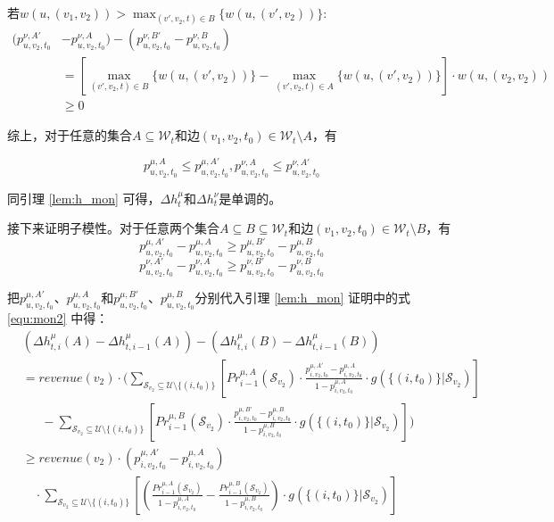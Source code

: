 若$w(u,(v_1,v_2)) > \max_{(v',v_2,t)\in B}\{w(u,(v',v_2))\}$:
\begin{align}
    (p_{u,v_2,t_0}^{\nu,A'}&-p_{u,v_2,t_0}^{\nu,A})-(p_{u,v_2,t_0}^{\nu,B'}-p_{u,v_2,t_0}^{\nu,B}) \\ 
    &=[\max_{(v',v_2,t)\in B}\{w(u,(v',v_2))\} - \max_{(v',v_2,t)\in A}\{w(u,(v',v_2))\}] \cdot w(u,(v_2,v_2)) \\
    &\ge 0
\end{align}

综上，对于任意的集合$A \subseteq \mathcal{W}_t$和边$(v_1,v_2,t_0) \in \mathcal{W}_t\setminus A$，有

\begin{equation}
    p_{u,v_2,t_0}^{\mu,A} \le p_{u,v_2,t_0}^{\mu,A'},p_{u,v_2,t_0}^{\nu,A} \le p_{u,v_2,t_0}^{\nu,A'}
\end{equation}

同引理 \ref{lem:h_mon} 可得，$\Delta h_t^\mu$和$\Delta h_t^\nu$是单调的。

接下来证明子模性。对于任意两个集合$A\subseteq B \subseteq \mathcal{W}_t$和边$(v_1,v_2,t_0) \in \mathcal{W}_t \setminus B$，有
\begin{equation}
    p_{u,v_2,t_0}^{\mu,A'}-p_{u,v_2,t_0}^{\mu,A}\ge  p_{u,v_2,t_0}^{\mu,B'}-p_{u,v_2,t_0}^{\mu,B}
\end{equation}
\begin{equation}
    p_{u,v_2,t_0}^{\nu,A'}-p_{u,v_2,t_0}^{\nu,A}\ge  p_{u,v_2,t_0}^{\nu,B'}-p_{u,v_2,t_0}^{\nu,B}
\end{equation}

把$p_{u,v_2,t_0}^{\mu,A'}$、$p_{u,v_2,t_0}^{\mu,A}$和$p_{u,v_2,t_0}^{\mu,B'}$、$p_{u,v_2,t_0}^{\mu,B}$分别代入引理 \ref{lem:h_mon} 证明中的式 \ref{equ:mon2} 中得：
\begin{align}
    &(\Delta h_{t,i}^{\mu}(A)-\Delta h_{t,i-1}^{\mu}(A)) - (\Delta h_{t,i}^{\mu}(B)-\Delta h_{t,i-1}^{\mu}(B)) \\ 
    &=revenue(v_2)\cdot (\sum_{\mathcal{S}_{v_2}\subseteq \mathcal{U}\setminus \{(i,t_0)\}}\left[Pr_{i-1}^{\mu,A}(\mathcal{S}_{v_2})\cdot\frac{p_{i,v_2,t_0}^{\mu,A'}-p_{i,v_2,t_0}^{\mu,A}}{1-p_{i,v_2,t_0}^{\mu,A}} \cdot g(\{(i,t_0)\} |\mathcal{S}_{v_2})\right] \nonumber \\
    & \  \ \ \ \ \ \ - \sum_{\mathcal{S}_{v_2}\subseteq \mathcal{U}\setminus \{(i,t_0)\}}\left[Pr_{i-1}^{\mu,B}(\mathcal{S}_{v_2})\cdot\frac{p_{i,v_2,t_0}^{\mu,B'}-p_{i,v_2,t_0}^{\mu,B}}{1-p_{i,v_2,t_0}^{\mu,B}} \cdot g(\{(i,t_0)\} |\mathcal{S}_{v_2})\right] )\\ 
    &\ge revenue(v_2)\cdot (p_{i,v_2,t_0}^{\mu,A'}-p_{i,v_2,t_0}^{\mu,A})  \nonumber \\ &\quad
    \cdot \sum_{\mathcal{S}_{v_2}\subseteq \mathcal{U}\setminus \{(i,t_0)\}}\left[\left(\frac{Pr_{i-1}^{\mu,A}(\mathcal{S}_{v_2})}{1-p_{i,v_2,t_0}^{\mu,A}}-\frac{Pr_{i-1}^{\mu,B}(\mathcal{S}_{v_2})}{1-p_{i,v_2,t_0}^{\mu,B}}\right) \cdot g(\{(i,t_0)\} |\mathcal{S}_{v_2})\right] \label{equ:prof_sub1}
\end{align}

